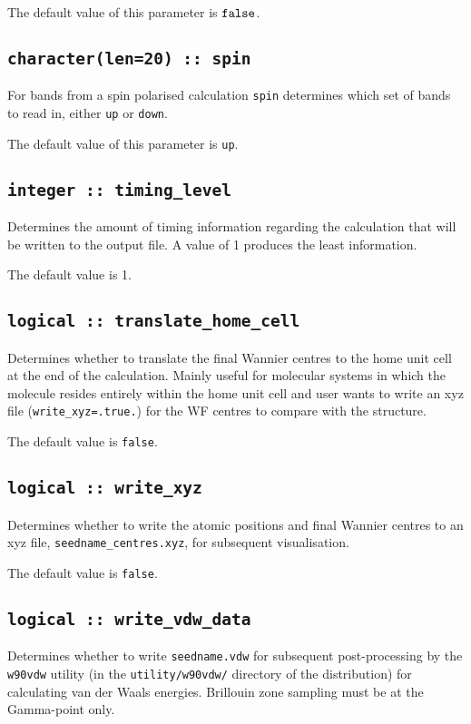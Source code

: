 The default value of this parameter is $\verb#false#$.


\subsection[spin]{\tt character(len=20) :: spin}
For bands from a spin polarised calculation {\tt spin} determines which set
of bands to read in, either \verb#up# or \verb#down#.

The default value of this parameter is \verb#up#.


\subsection[timing\_level]{\tt integer :: timing\_level}

Determines the amount of timing information regarding the calculation
that will be written to the output file. A value of 1 produces the
least information.

The default value is 1.

\subsection[translate\_home\_cell]{\tt logical :: translate\_home\_cell}

Determines whether to translate the final Wannier centres to the home
unit cell at the end of the calculation. Mainly useful for molecular
systems in which the molecule resides entirely within the home unit
cell and user wants to write an xyz file ({\tt write\_xyz=.true.}) for
the WF centres to compare with the structure.

The default value is \verb#false#.

\subsection[write\_xyz]{\tt logical :: write\_xyz}

Determines whether to write the atomic positions and
final Wannier centres to an xyz file,
\verb#seedname_centres.xyz#, for subsequent
visualisation.

The default value is \verb#false#.

\subsection[write\_vdw\_data]{\tt logical :: write\_vdw\_data}

Determines whether to write \verb#seedname.vdw# for
subsequent post-processing by the \verb#w90vdw# utility
(in the \verb#utility/w90vdw/# directory of the
distribution) for calculating van der Waals energies.
Brillouin zone sampling must be at the Gamma-point only.


